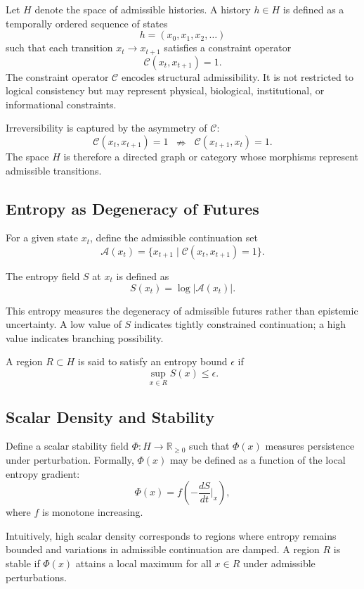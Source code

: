 \documentclass[12pt]{article}
\begin{document}
Let $H$ denote the space of admissible histories. A history $h \in H$ is defined as a temporally ordered sequence of states
\[
h = (x_0, x_1, x_2, \dots)
\]
such that each transition $x_{t} \to x_{t+1}$ satisfies a constraint operator
\[
\mathcal{C}(x_t, x_{t+1}) = 1.
\]
The constraint operator $\mathcal{C}$ encodes structural admissibility. It is not restricted to logical consistency but may represent physical, biological, institutional, or informational constraints.

Irreversibility is captured by the asymmetry of $\mathcal{C}$:
\[
\mathcal{C}(x_t, x_{t+1}) = 1 \;\; \nRightarrow \;\; \mathcal{C}(x_{t+1}, x_t) = 1.
\]
The space $H$ is therefore a directed graph or category whose morphisms represent admissible transitions.

\subsection{Entropy as Degeneracy of Futures}

For a given state $x_t$, define the admissible continuation set
\[
\mathcal{A}(x_t) = \{ x_{t+1} \mid \mathcal{C}(x_t, x_{t+1}) = 1 \}.
\]

The entropy field $S$ at $x_t$ is defined as
\[
S(x_t) = \log |\mathcal{A}(x_t)|.
\]

This entropy measures the degeneracy of admissible futures rather than epistemic uncertainty. A low value of $S$ indicates tightly constrained continuation; a high value indicates branching possibility.

A region $R \subset H$ is said to satisfy an entropy bound $\epsilon$ if
\[
\sup_{x \in R} S(x) \leq \epsilon.
\]

\subsection{Scalar Density and Stability}

Define a scalar stability field $\Phi : H \to \mathbb{R}_{\geq 0}$ such that $\Phi(x)$ measures persistence under perturbation. Formally, $\Phi(x)$ may be defined as a function of the local entropy gradient:
\[
\Phi(x) = f\!\left( - \frac{dS}{dt} \bigg|_{x} \right),
\]
where $f$ is monotone increasing.

Intuitively, high scalar density corresponds to regions where entropy remains bounded and variations in admissible continuation are damped. A region $R$ is stable if $\Phi(x)$ attains a local maximum for all $x \in R$ under admissible perturbations.
\end{document}
